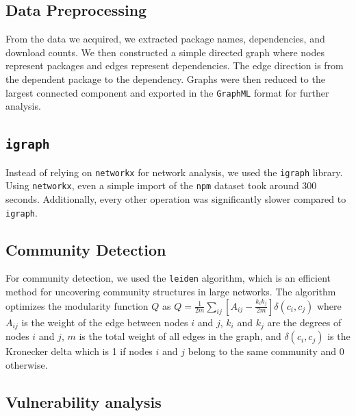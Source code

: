 \documentclass[9pt,twocolumn,twoside]{pnas-report}
\begin{document}
\subsection*{Data Preprocessing} From the data we acquired, we extracted package names, dependencies, and download counts. We then constructed a simple directed graph where nodes represent packages and edges represent dependencies. The edge direction is from the dependent package to the dependency. Graphs were then reduced to the largest connected component and exported in the \texttt{GraphML} format for further analysis.

\subsection*{\texttt{igraph}} Instead of relying on \texttt{networkx} for network analysis, we used the \texttt{igraph} library. Using \texttt{networkx}, even a simple import of the \texttt{npm} dataset took around 300 seconds. Additionally, every other operation was significantly slower compared to \texttt{igraph}.

\subsection*{Community Detection} For community detection, we used the \texttt{leiden} algorithm, which is an efficient method for uncovering community structures in large networks.
The algorithm optimizes the modularity function $ Q $ as $
	Q = \frac{1}{2m} \sum_{ij} \left[ A_{ij} - \frac{k_i k_j}{2m} \right] \delta(c_i, c_j)
$
where \( A_{ij} \) is the weight of the edge between nodes \( i \) and \( j \), \( k_i \) and \( k_j \) are the degrees of nodes \( i \) and \( j \), \( m \) is the total weight of all edges in the graph, and \( \delta(c_i, c_j) \) is the Kronecker delta which is 1 if nodes \( i \) and \( j \) belong to the same community and 0 otherwise.

\subsection*{Vulnerability analysis}

\normalsize




\end{document}
